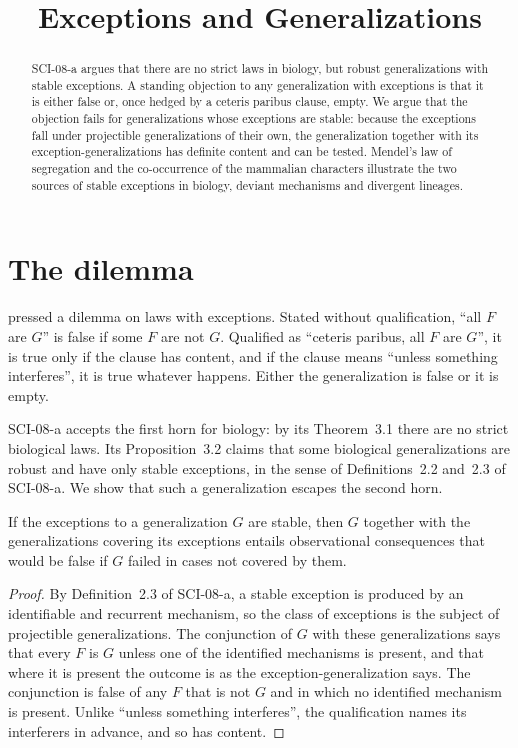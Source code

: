 \documentclass{situationist-preprint}
\title{Exceptions and Generalizations}
\begin{document}
\maketitle

\begin{abstract}
SCI-08-a argues that there are no strict laws in biology, but robust generalizations with stable exceptions. A standing objection to any generalization with exceptions is that it is either false or, once hedged by a ceteris paribus clause, empty. We argue that the objection fails for generalizations whose exceptions are stable: because the exceptions fall under projectible generalizations of their own, the generalization together with its exception-generalizations has definite content and can be tested. Mendel's law of segregation and the co-occurrence of the mammalian characters illustrate the two sources of stable exceptions in biology, deviant mechanisms and divergent lineages.
\end{abstract}

\section{The dilemma}\label{s:dilemma}

\citet{EarmanRoberts1999} pressed a dilemma on laws with exceptions. Stated without qualification, \enquote{all $F$ are $G$} is false if some $F$ are not $G$. Qualified as \enquote{ceteris paribus, all $F$ are $G$}, it is true only if the clause has content, and if the clause means \enquote{unless something interferes}, it is true whatever happens. Either the generalization is false or it is empty.

SCI-08-a accepts the first horn for biology: by its Theorem~3.1 there are no strict biological laws. Its Proposition~3.2 claims that some biological generalizations are robust and have only stable exceptions, in the sense of Definitions~2.2 and~2.3 of SCI-08-a. We show that such a generalization escapes the second horn.

\begin{proposition}\label{p:content}
If the exceptions to a generalization $G$ are stable, then $G$ together with the generalizations covering its exceptions entails observational consequences that would be false if $G$ failed in cases not covered by them.
\end{proposition}

\begin{proof}
By Definition~2.3 of SCI-08-a, a stable exception is produced by an identifiable and recurrent mechanism, so the class of exceptions is the subject of projectible generalizations. The conjunction of $G$ with these generalizations says that every $F$ is $G$ unless one of the identified mechanisms is present, and that where it is present the outcome is as the exception-generalization says. The conjunction is false of any $F$ that is not $G$ and in which no identified mechanism is present. Unlike \enquote{unless something interferes}, the qualification names its interferers in advance, and so has content.
\end{proof}
\end{document}
